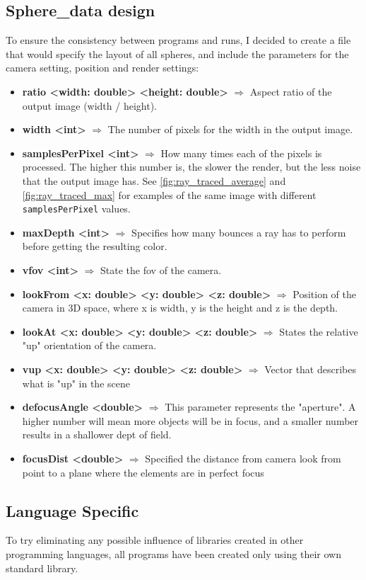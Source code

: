 \subsection{Sphere\_data design}

To ensure the consistency between programs and runs, I decided to create a file that would specify the layout of all spheres, and include the parameters for the camera setting, position and render settings:
\begin{itemize}
    \item \textbf{ratio <width: double> <height: double>} $\Rightarrow{}$ Aspect ratio of the output image (width / height).
    \item \textbf{width <int>} $\Rightarrow{}$ The number of pixels for the width in the output image.
    \item \textbf{samplesPerPixel <int>} $\Rightarrow{}$ How many times each of the pixels is processed. The higher this number is, the slower the render, but the less noise that the output image has. See \autoref{fig:ray_traced_average} and \autoref{fig:ray_traced_max} for examples of the same image with different \texttt{samplesPerPixel} values.
    \item \textbf{maxDepth <int>} $\Rightarrow{}$ Specifies how many bounces a ray has to perform before getting the resulting color.
    \item \textbf{vfov <int>} $\Rightarrow{}$ State the \gls{fov} of the camera.
    \item \textbf{lookFrom <x: double> <y: double> <z: double>} $\Rightarrow{}$ Position of the camera in 3D space, where x is width, y is the height and z is the depth.
    \item \textbf{lookAt <x: double> <y: double> <z: double>} $\Rightarrow{}$ States the relative "up" orientation of the camera.
    \item \textbf{vup <x: double> <y: double> <z: double>} $\Rightarrow{}$ Vector that describes what is "up" in the scene
    \item \textbf{defocusAngle <double>} $\Rightarrow{}$ This parameter represents the "aperture". A higher number will mean more objects will be in focus, and a smaller number results in a shallower dept of field.
    \item \textbf{focusDist <double>} $\Rightarrow{}$ Specified the distance from camera look from point to a plane where the elements are in perfect focus
\end{itemize}

\subsection{Language Specific}
To try eliminating any possible influence of libraries created in other programming languages, all programs have been created only using their own standard library.

